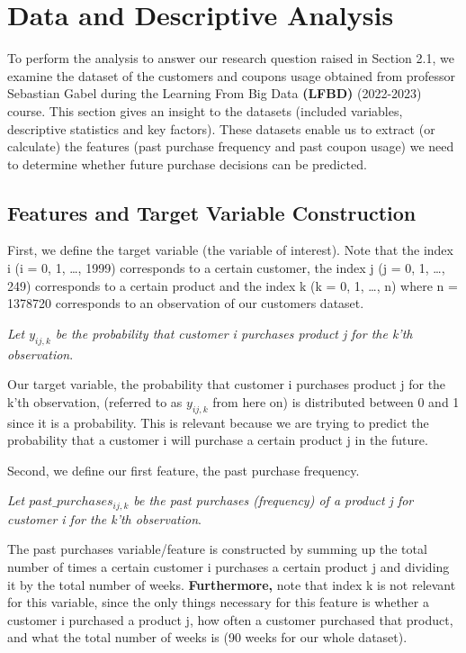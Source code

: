 \section{Data and Descriptive Analysis}
To perform the analysis to answer our research question raised in Section 2.1,
we examine the dataset of the customers and coupons usage obtained from
professor Sebastian Gabel during the Learning From Big Data \textbf{(LFBD)} (2022-2023) course.
This section gives an insight to the datasets (included variables, descriptive
statistics and key factors). These datasets enable us to extract (or calculate) the features
(past purchase frequency and past coupon usage) we need to determine whether
future purchase decisions can be predicted.

\subsection{Features and Target Variable Construction}
First, we define the target variable (the variable of interest). Note that the
index i (i = 0, 1, \dots, 1999) corresponds to a certain customer, the index j (j = 0,
1, \dots, 249) corresponds to a certain product and the index k (k = 0, 1,
\dots, n) where n = 1378720 corresponds to an observation of our customers
dataset.

\textit{Let $y_{ij,k}$ be the probability that customer i purchases product j
for the k'th observation}.

Our target variable, the probability that customer i purchases 
product j for the k'th observation, (referred to as $y_{ij,k}$ from here on) 
is distributed between 0 and 1 since it is a probability. 
This is relevant because we are trying to predict the probability that a customer i 
will purchase a certain product j in the future.

Second, we define our first feature, the past purchase frequency.

\textit{Let $past\_purchases_{ij,k}$ be the past purchases (frequency) of a
product j for customer i for the k'th observation}.

The past purchases variable/feature is constructed by summing up the total
number of times a certain customer i purchases a certain product j and dividing
it by the total number of weeks. \textbf{Furthermore,} note that index k is not
relevant for this variable, since the only things necessary for this feature is
whether a customer i purchased a product j, how often a customer purchased that
product, and what the total number of weeks is (90 weeks for our whole dataset).

